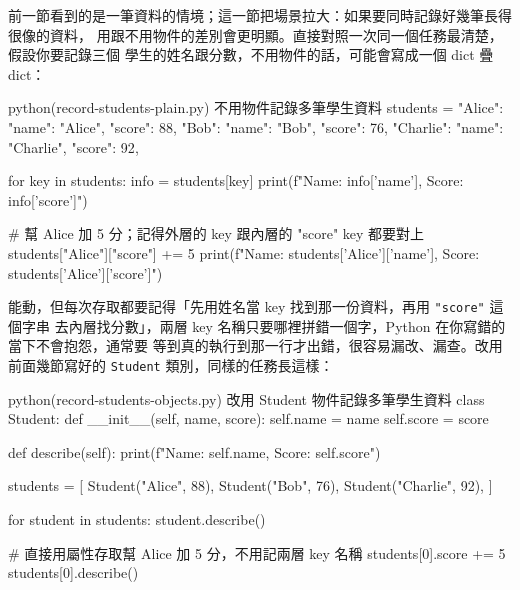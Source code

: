 前一節看到的是一筆資料的情境；這一節把場景拉大：如果要同時記錄好幾筆長得很像的資料，
用跟不用物件的差別會更明顯。直接對照一次同一個任務最清楚，假設你要記錄三個
學生的姓名跟分數，不用物件的話，可能會寫成一個 dict 疊 dict：

\begin{example}{python}{(record-students-plain.py) 不用物件記錄多筆學生資料}
students = {
    "Alice": {"name": "Alice", "score": 88},
    "Bob": {"name": "Bob", "score": 76},
    "Charlie": {"name": "Charlie", "score": 92},
}

for key in students:
    info = students[key]
    print(f"Name: {info['name']}, Score: {info['score']}")

# 幫 Alice 加 5 分；記得外層的 key 跟內層的 "score" key 都要對上
students["Alice"]["score"] += 5
print(f"Name: {students['Alice']['name']}, Score: {students['Alice']['score']}")
\end{example}


能動，但每次存取都要記得「先用姓名當 key 找到那一份資料，再用 \texttt{"score"} 這個字串
去內層找分數」，兩層 key 名稱只要哪裡拼錯一個字，Python 在你寫錯的當下不會抱怨，通常要
等到真的執行到那一行才出錯，很容易漏改、漏查。改用前面幾節寫好的 \texttt{Student}
類別，同樣的任務長這樣：

\begin{example}{python}{(record-students-objects.py) 改用 Student 物件記錄多筆學生資料}
class Student:
    def __init__(self, name, score):
        self.name = name
        self.score = score

    def describe(self):
        print(f"Name: {self.name}, Score: {self.score}")


students = [
    Student("Alice", 88),
    Student("Bob", 76),
    Student("Charlie", 92),
]

for student in students:
    student.describe()

# 直接用屬性存取幫 Alice 加 5 分，不用記兩層 key 名稱
students[0].score += 5
students[0].describe()
\end{example}


